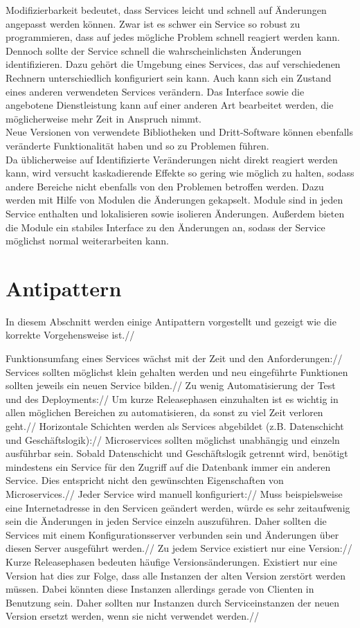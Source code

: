 Modifizierbarkeit bedeutet, dass Services leicht und schnell auf Änderungen angepasst werden können. Zwar ist es schwer ein Service so robust zu programmieren, dass auf jedes mögliche Problem schnell reagiert werden kann. Dennoch sollte der Service schnell die wahrscheinlichsten Änderungen identifizieren. Dazu gehört die Umgebung eines Services, das auf verschiedenen Rechnern unterschiedlich konfiguriert sein kann. Auch kann sich ein Zustand eines anderen verwendeten Services verändern. Das Interface sowie die angebotene Dienstleistung kann auf einer anderen Art bearbeitet werden, die möglicherweise mehr Zeit in Anspruch nimmt.\\
Neue Versionen von verwendete Bibliotheken und Dritt-Software können ebenfalls veränderte Funktionalität haben und so zu Problemen führen.\\
Da üblicherweise auf Identifizierte Veränderungen nicht direkt reagiert werden kann, wird versucht kaskadierende Effekte so gering wie möglich zu halten, sodass andere Bereiche nicht ebenfalls von den Problemen betroffen werden. Dazu werden mit Hilfe von Modulen die Änderungen gekapselt. Module sind in jeden Service enthalten und lokalisieren sowie isolieren Änderungen. Außerdem bieten die Module ein stabiles Interface zu den Änderungen an, sodass der Service möglichst normal weiterarbeiten kann. 

\section{Antipattern}

In diesem Abschnitt werden einige Antipattern vorgestellt und gezeigt wie die korrekte Vorgehensweise ist.//

Funktionsumfang eines Services wächst mit der Zeit und den Anforderungen://
Services sollten möglichst klein gehalten werden und neu eingeführte Funktionen sollten jeweils ein neuen Service bilden.//
Zu wenig Automatisierung der Test und des Deployments://
Um kurze Releasephasen einzuhalten ist es wichtig in allen möglichen Bereichen zu automatisieren, da sonst zu viel Zeit verloren geht.//
Horizontale Schichten werden als Services abgebildet (z.B. Datenschicht und Geschäftslogik)://
Microservices sollten möglichst unabhängig und einzeln ausführbar sein. Sobald Datenschicht und Geschäftslogik getrennt wird, benötigt mindestens ein Service für den Zugriff auf die Datenbank immer ein anderen Service. Dies entspricht nicht den gewünschten Eigenschaften von Microservices.//
Jeder Service wird manuell konfiguriert://
Muss beispielsweise eine Internetadresse in den Servicen geändert werden, würde es sehr zeitaufwenig sein die Änderungen in jeden Service einzeln auszuführen. Daher sollten die Services mit einem Konfigurationsserver verbunden sein und Änderungen über diesen Server ausgeführt werden.//
Zu jedem Service existiert nur eine Version://
Kurze Releasephasen bedeuten häufige Versionsänderungen. Existiert nur eine Version hat dies zur Folge, dass alle Instanzen der alten Version zerstört werden müssen. Dabei könnten diese Instanzen allerdings gerade von Clienten in Benutzung sein. Daher sollten nur Instanzen durch Serviceinstanzen der neuen Version ersetzt werden, wenn sie nicht verwendet werden.//




